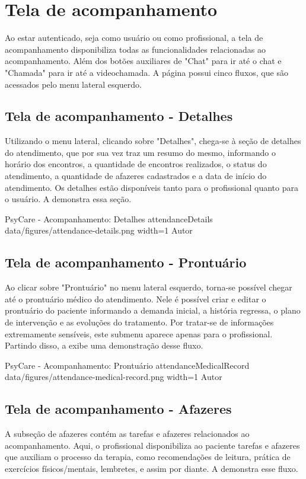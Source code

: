 \section{Tela de acompanhamento}
\label{sec:acompanhamento}

Ao estar autenticado, seja como usuário ou como profissional, a tela de acompanhamento disponibiliza todas as funcionalidades relacionadas ao acompanhamento. Além dos botões auxiliares de "Chat"  para ir até o chat e "Chamada" para ir até a videochamada. A página possui cinco fluxos, que são acessados pelo menu lateral esquerdo.

\subsection{Tela de acompanhamento - Detalhes}
\label{sec:acompanhamentoDetalhes}
Utilizando o menu lateral, clicando sobre "Detalhes", chega-se à seção de detalhes do atendimento, que por sua vez traz um resumo do mesmo, informando o horário dos encontros, a quantidade de encontros realizados, o status do atendimento, a quantidade de afazeres cadastrados e a data de início do atendimento. Os detalhes estão disponíveis tanto para o profissional quanto para o usuário. A  demonstra essa seção.

\image
    {PsyCare - Acompanhamento: Detalhes}
    {attendanceDetails}
    {data/figures/attendance-details.png}
    {width=1\textwidth}
    {Autor}

\subsection{Tela de acompanhamento - Prontuário}
\label{sec:acompanhamentoProntuario}
Ao clicar sobre "Prontuário" no menu lateral esquerdo, torna-se possível chegar até o prontuário médico do atendimento. Nele é possível criar e editar o prontuário do paciente informando a demanda inicial, a história regressa, o plano de intervenção e as evoluções do tratamento. Por tratar-se de informações extremamente sensíveis, este submenu aparece apenas para o profissional. Partindo disso, a  exibe uma demonstração desse fluxo.

\image
    {PsyCare - Acompanhamento: Prontuário}
    {attendanceMedicalRecord}
    {data/figures/attendance-medical-record.png}
    {width=1\textwidth}
    {Autor}

\subsection{Tela de acompanhamento - Afazeres}
\label{sec:acompanhamentoAfazeres}
A subseção de afazeres contém as tarefas e afazeres relacionados ao acompanhamento. Aqui, o profissional disponibiliza ao paciente tarefas e afazeres que auxiliam o processo da terapia, como recomendações de leitura, prática de exercícios físicos/mentais, lembretes, e assim por diante. A  demonstra esse fluxo.

